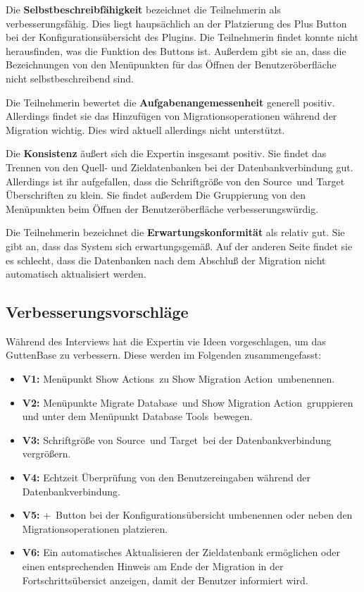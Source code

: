 Die \textbf{Selbstbeschreibfähigkeit} bezeichnet die Teilnehmerin als verbesserungsfähig. Dies liegt haupsächlich an der Platzierung des Plus Button bei der Konfigurationsübersicht des Plugins. Die Teilnehmerin findet konnte nicht herausfinden, was die Funktion des Buttons ist. Außerdem gibt sie an, dass die Bezeichnungen von den Menüpunkten für das Öffnen der Benutzeröberfläche nicht selbstbeschreibend sind.

Die Teilnehmerin bewertet die \textbf{Aufgabenangemessenheit} generell positiv. Allerdings findet sie das Hinzufügen von Migrationsoperationen während der Migration wichtig. Dies wird aktuell allerdings nicht unterstützt.

Die \textbf{Konsistenz} äußert sich die Expertin insgesamt positiv. Sie findet das Trennen von den Quell- und Zieldatenbanken bei der Datenbankverbindung gut. Allerdings ist ihr aufgefallen, dass die Schriftgröße von den \glqq Source\grqq\, und \glqq Target\grqq\, Überschriften zu klein. Sie findet außerdem Die Gruppierung von den Menüpunkten beim Öffnen der Benutzeröberfläche verbesserungswürdig. 

Die Teilnehmerin bezeichnet die \textbf{Erwartungskonformität} als relativ gut. Sie gibt an, dass das System sich erwartungsgemäß. Auf der anderen Seite findet sie es schlecht, dass die Datenbanken nach dem Abschluß der Migration nicht automatisch aktualisiert werden.


\subsection*{\textbf{Verbesserungsvorschläge}}
\label{sec:verbesserung}
Während des Interviews hat die Expertin vie Ideen vorgeschlagen, um das GuttenBase zu verbessern. Diese werden im Folgenden zusammengefasst:
\begin{itemize}
	\item \textbf{V1:} Menüpunkt \glqq Show Actions\grqq\, zu \glqq Show Migration Action\grqq\, umbenennen.
	\item \textbf{V2:} Menüpunkte \glqq Migrate Database\grqq\, und \glqq Show Migration Action\grqq\, gruppieren und unter dem Menüpunkt \glqq Database Tools\grqq\, bewegen. 
	\item \textbf{V3:} Schriftgröße von \glqq Source\grqq\, und \glqq Target\grqq\, bei der Datenbankverbindung vergrößern. 
	\item \textbf{V4:} Echtzeit Überprüfung von den Benutzereingaben während der Datenbankverbindung.
	\item \textbf{V5:} \glqq +\grqq\, Button bei der Konfigurationsübersicht umbenennen oder neben den Migrationsoperationen platzieren.
	\item \textbf{V6:} Ein automatisches Aktualisieren der Zieldatenbank ermöglichen oder einen entsprechenden Hinweis am Ende der Migration in der Fortschrittsübersict anzeigen, damit der Benutzer informiert wird.
\end{itemize}



